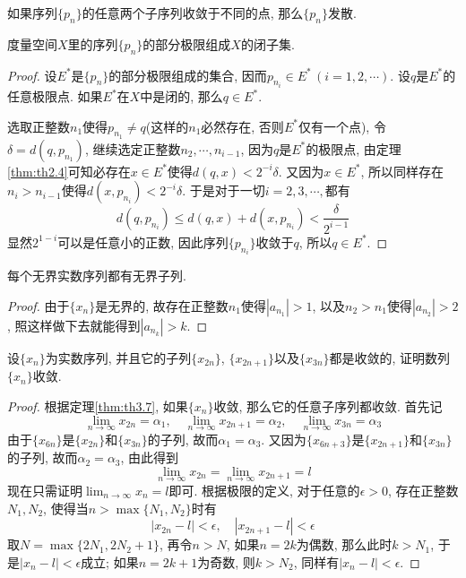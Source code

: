 \documentclass[cn,12pt,math=mtpro2,citestyle=gb7714-2015,bibstyle=gb7714-2015,twocol]{elegantbook}
\newcommand{\limn }{\lim_{n\to\infty}}
\begin{document}
\begin{corollary}
如果序列$\{p_n\}$的任意两个子序列收敛于不同的点, 那么$\{p_n\}$发散.
\end{corollary}
\begin{theorem}
  度量空间$X$里的序列$\{p_n\}$的部分极限组成$X$的闭子集.
\end{theorem}
\begin{proof}
  设$E^\ast$是$\{p_n\}$的部分极限组成的集合, 因而$p_{n_i}\in E^\ast \,(i=1,2,\cdots)$. 设$q$是$E^\ast$的任意极限点. 如果$E^\ast$在$X$中是闭的, 那么$q\in E^\ast$.

  选取正整数$n_1$使得$p_{n_1}\neq q$(这样的$n_1$必然存在, 否则$E^\ast$仅有一个点), 令$\delta=d(q,p_{n_1})$, 继续选定正整数$n_2,\cdots,n_{i-1}$, 因为$q$是$E^\ast$的极限点, 由定理\ref{thm:th2.4}可知必存在$x\in E^\ast$使得$d(q,x)<2^{-i}\delta$. 又因为$x\in E^\ast$, 所以同样存在$n_i>n_{i-1}$使得$d(x,p_ {n_i})<2^{-i}\delta$. 于是对于一切$i=2,3,\cdots,$都有
  $$d(q,p_{n_i})\leq d(q,x)+d(x,p_{n_i})<\frac{\delta}{2^{i-1}}$$
  显然$2^{1-i}$可以是任意小的正数, 因此序列$\{p_{n_i}\}$收敛于$q$, 所以$q\in E^\ast$.
\end{proof}

\begin{example}
每个无界实数序列都有无界子列.
\end{example}
\begin{proof}
  由于$\{x_n\}$是无界的, 故存在正整数$n_1$使得$|a_{n_1}|>1$, 以及$n_2>n_1$使得$|a_{n_2}|>2$, 照这样做下去就能得到$|a_{n_k}|>k$.
\end{proof}

\begin{example}
设$\{x_n\}$为实数序列, 并且它的子列$\{x_{2n}\}$, $\{x_{2n+1}\}$以及$\{x_{3n}\}$都是收敛的, 证明数列$\{x_n\}$收敛.
\end{example}
\begin{proof}
  根据定理\ref{thm:th3.7}, 如果$\{x_n\}$收敛, 那么它的任意子序列都收敛. 首先记
  $$\limn x_{2n}=\alpha_1,\quad \limn x_{2n+1}=\alpha_2,\quad \limn x_{3n}=\alpha_3$$
  由于$\{x_{6n}\}$是$\{x_{2n}\}$和$\{x_{3n}\}$的子列, 故而$\alpha_1=\alpha_3$. 又因为$\{x_{6n+3}\}$是$\{x_{2n+1}\}$和$\{x_{3n}\}$的子列, 故而$\alpha_2=\alpha_3$, 由此得到
  $$\limn x_{2n}=\limn x_{2n+1}=l$$
  现在只需证明$\limn x_n=l$即可. 根据极限的定义, 对于任意的$\epsilon>0$, 存在正整数$N_1,N_2$, 使得当$n>\max\{N_1,N_2\}$时有
  $$|x_{2n}-l|<\epsilon,\quad |x_{2n+1}-l|<\epsilon$$
  取$N=\max\{2N_1,2N_2+1\}$, 再令$n>N$, 如果$n=2k$为偶数, 那么此时$k>N_1$, 于是$|x_n-l|<\epsilon$成立; 如果$n=2k+1$为奇数, 则$k>N_2$, 同样有$|x_n-l|<\epsilon$.
\end{proof}
\end{document}
